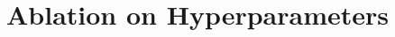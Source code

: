 \documentclass{article}
\begin{document}



\newpage
\section{Ablation on Hyperparameters}
\label{app:ablation}
\end{document}
